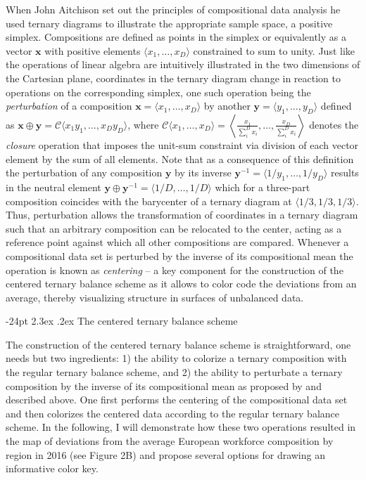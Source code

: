 \documentclass[10pt, twoside, parskip=half]{article}
\makeatletter
\renewcommand\section{\@startsection {section}{1}{\z@}%
                                   {-24pt}%
                                   {2.3ex \@plus.2ex}%
                                   {\normalfont\large\bfseries}}
\makeatother
\begin{document}
When John Aitchison set out the principles of compositional data
analysis \citep{Aitchison1982, Aitchison1986, PawlowskyGlahn2015} he
used ternary diagrams to illustrate the appropriate sample space, a
positive simplex. Compositions are defined as points in the simplex or
equivalently as a vector \(\mathbf{x}\) with positive elements
\(\langle x_1,\ldots,x_D \rangle\) constrained to sum to unity. Just
like the operations of linear algebra are intuitively illustrated in the
two dimensions of the Cartesian plane, coordinates in the ternary
diagram change in reaction to operations on the corresponding simplex,
one such operation being the \emph{perturbation} of a composition
\(\mathbf{x}=\langle x_1, \ldots, x_D \rangle\) by another
\(\mathbf{y}=\langle y_1, \ldots, y_D \rangle\) defined as
\(\mathbf{x}\oplus \mathbf{y}=\mathcal{C}\langle x_1y_1, \ldots, x_Dy_D \rangle\),
where
\(\mathcal{C}\langle x_1, \ldots, x_D \rangle = \left\langle\frac{x_1}{\sum_i^D x_i},\ldots, \frac{x_D}{\sum_i^D x_i}\right\rangle\)
denotes the \emph{closure} operation that imposes the unit-sum
constraint via division of each vector element by the sum of all
elements. Note that as a consequence of this definition the perturbation
of any composition \(\mathbf{y}\) by its inverse
\(\mathbf{y}^{-1}=\langle 1/y_1, \ldots, 1/y_D \rangle\) results in the
neutral element
\(\mathbf{y}\oplus \mathbf{y}^{-1}=\langle 1/D, \ldots, 1/D \rangle\)
which for a three-part composition coincides with the barycenter of a
ternary diagram at \(\langle 1/3, 1/3, 1/3 \rangle\). Thus, perturbation
allows the transformation of coordinates in a ternary diagram such that
an arbitrary composition can be relocated to the center, acting as a
reference point against which all other compositions are compared.
Whenever a compositional data set is perturbed by the inverse of its
compositional mean the operation is known as \emph{centering} -- a key
component for the construction of the centered ternary balance scheme as
it allows to color code the deviations from an average, thereby
visualizing structure in surfaces of unbalanced data.

\hypertarget{the-centered-ternary-balance-scheme}{%
\section{The centered ternary balance
scheme}\label{the-centered-ternary-balance-scheme}}

The construction of the centered ternary balance scheme is
straightforward, one needs but two ingredients: 1) the ability to
colorize a ternary composition with the regular ternary balance scheme,
and 2) the ability to perturbate a ternary composition by the inverse of
its compositional mean as proposed by \citet{VonEynatten2002} and
described above. One first performs the centering of the compositional
data set and then colorizes the centered data according to the regular
ternary balance scheme. In the following, I will demonstrate how these
two operations resulted in the map of deviations from the average
European workforce composition by region in 2016 (see Figure 2B) and
propose several options for drawing an informative color key.
\end{document}
